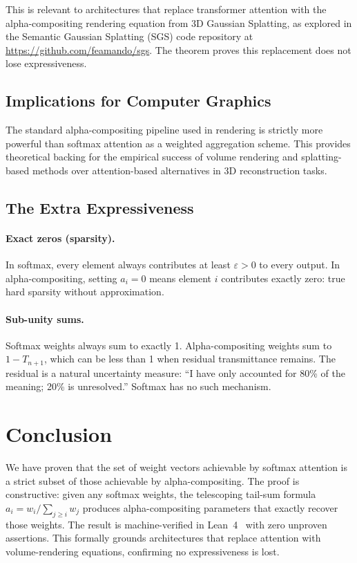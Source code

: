 \documentclass[twoside,11pt]{article}
\begin{document}
This is relevant to architectures that replace transformer attention with the alpha-compositing rendering equation from 3D Gaussian Splatting, as explored in the Semantic Gaussian Splatting (SGS) code repository at \url{https://github.com/feamando/sgs}. The theorem proves this replacement does not lose expressiveness.

\subsection{Implications for Computer Graphics}

The standard alpha-compositing pipeline used in rendering is strictly more powerful than softmax attention as a weighted aggregation scheme. This provides theoretical backing for the empirical success of volume rendering and splatting-based methods over attention-based alternatives in 3D reconstruction tasks.

\subsection{The Extra Expressiveness}

\paragraph{Exact zeros (sparsity).} In softmax, every element always contributes at least $\varepsilon > 0$ to every output. In alpha-compositing, setting $a_i = 0$ means element $i$ contributes exactly zero: true hard sparsity without approximation.

\paragraph{Sub-unity sums.} Softmax weights always sum to exactly 1. Alpha-compositing weights sum to $1 - T_{n+1}$, which can be less than 1 when residual transmittance remains. The residual is a natural uncertainty measure: ``I have only accounted for 80\% of the meaning; 20\% is unresolved.'' Softmax has no such mechanism.

\section{Conclusion}

We have proven that the set of weight vectors achievable by softmax attention is a strict subset of those achievable by alpha-compositing. The proof is constructive: given any softmax weights, the telescoping tail-sum formula $a_i = w_i / \sum_{j \geq i} w_j$ produces alpha-compositing parameters that exactly recover those weights. The result is machine-verified in Lean~4~\citep{demoura2021} with zero unproven assertions. This formally grounds architectures that replace attention with volume-rendering equations, confirming no expressiveness is lost.
\end{document}
